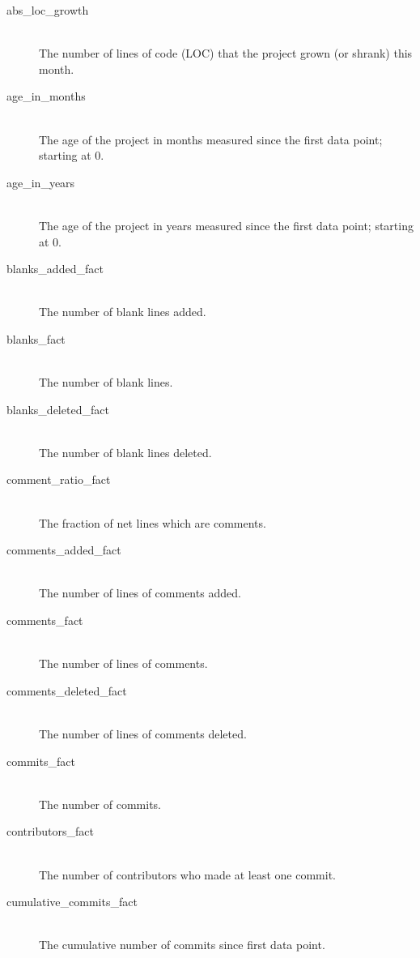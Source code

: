 \begin{description}
	\item[abs\_loc\_growth] \hfill \\
	The number of lines of code (LOC) that the project grown (or shrank) this
	month.

	\item[age\_in\_months] \hfill \\
	The age of the project in months measured since the first data point;
	starting at 0.

	\item[age\_in\_years] \hfill \\
	The age of the project in years measured since the first data point; starting
	at 0.

	\item[blanks\_added\_fact] \hfill \\
	The number of blank lines added.

	\item[blanks\_fact] \hfill \\
	The number of blank lines.

	\item[blanks\_deleted\_fact] \hfill \\
	The number of blank lines deleted.

	\item[comment\_ratio\_fact] \hfill \\
	The fraction of net lines which are comments.

	\item[comments\_added\_fact] \hfill \\
	The number of lines of comments added.

	\item[comments\_fact] \hfill \\
	The number of lines of comments.

	\item[comments\_deleted\_fact] \hfill \\
	The number of lines of comments deleted.

	\item[commits\_fact] \hfill \\
	The number of commits.

	\item[contributors\_fact] \hfill \\
	The number of contributors who made at least one commit.

	\item[cumulative\_commits\_fact] \hfill \\
	The cumulative number of commits since first data point.


\end{description}
